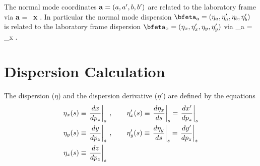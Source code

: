 The normal mode coordinates ${\bf a} = (a, a', b, b')$ are related to
the laboratory frame via
  \Begineq
    {\bf a} = \bfV\inv \, {\bf x}
    . \label{avx}
  \Endeq 
In particular the normal mode dispersion $\bfeta_a = (\eta_a,
\eta'_a, \eta_b, \eta'_b)$ is related to the laboratory frame
dispersion $\bfeta_x = (\eta_x, \eta'_x, \eta_y, \eta'_y)$ via
  \Begineq
    {\bfeta_a} = \bfV\inv \, {\bfeta_x}
    . \label{etaavx}
  \Endeq 

\section{Dispersion Calculation}
\label{s:dispersion}

The dispersion ($\eta$) and the dispersion derivative ($\eta'$) are 
defined by the equations
\begin{align}
  \eta_x(s) &\equiv \left. \frac{dx}{dp_z} \right|_s \> , \qquad
    \eta'_x(s) \equiv \left. \frac{d\eta_x}{ds} \right|_s
    = \left. \frac{dx'}{dp_z} \right|_s \nonumber \\
  \eta_y(s) &\equiv \left. \frac{dy}{dp_z} \right|_s \> , \qquad
    \eta'_y(s) \equiv \left. \frac{d\eta_y}{ds} \right|_s
    = \left. \frac{dy'}{dp_z} \right|_s \\
  \eta_z(s) &\equiv \left. \frac{dz}{dp_z} \right|_s \nonumber
\end{align}

